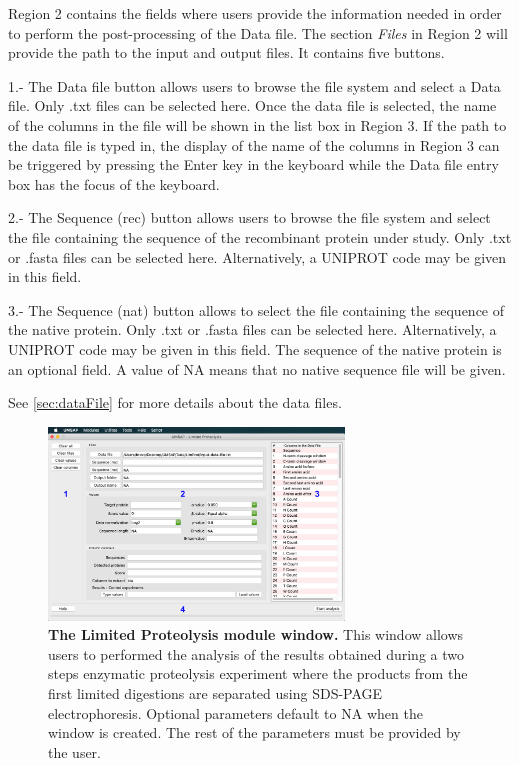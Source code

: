 Region \num{2} contains the fields where users provide the information needed in order to perform the post-processing of the Data file. The section \textit{Files} in Region \num{2} will provide the path to the input and output files. It contains five buttons. 

\num{1}.- The Data file button allows users to browse the file system and select a Data file. Only .txt files can be selected here. Once the data file is selected, the name of the columns in the file will be shown in the list box in Region \num{3}. If the path to the data file is typed in, the display of the name of the columns in Region \num{3} can be triggered by pressing the Enter key in the keyboard while the Data file entry box has the focus of the keyboard.

\num{2}.- The Sequence (rec) button allows users to browse the file system and select the file containing the sequence of the recombinant protein under study. Only .txt or .fasta files can be selected here. Alternatively, a UNIPROT code may be given in this field.

\num{3}.- The Sequence (nat) button allows to select the file containing the sequence of the native protein. Only .txt or .fasta files can be selected here. Alternatively, a UNIPROT code may be given in this field. The sequence of the native protein is an optional field. A value of NA means that no native sequence file will be given. 

See \autoref{sec:dataFile} for more details about the data files.

\begin{figure}[h]
	\centering
	\includegraphics[width=0.7\textwidth]{./IMAGES/MOD-LIMPROT/limprot-mod.jpg}
	\caption[The Limited Proteolysis module window]{\textbf{The Limited Proteolysis module window.} This window allows users to performed the analysis of the results obtained during a two steps enzymatic proteolysis experiment where the products from the first limited digestions are separated using SDS-PAGE electrophoresis. Optional parameters default to NA when the window is created. The rest of the parameters must be provided by the user.} 
	\label{fig:limprotMainWindow}
	\vspace{-5pt} 	
\end{figure} 

